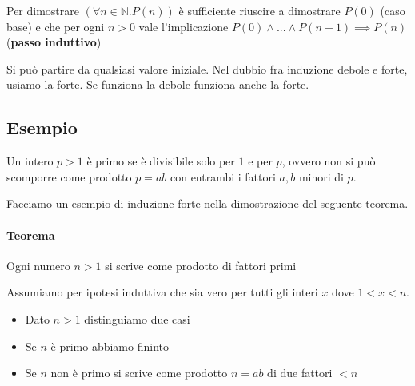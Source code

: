 Per dimostrare $\left(\forall n \in \mathbb{N} . P(n) \right)$ è sufficiente riuscire a dimostrare $P(0)$ (caso base) e che per ogni $n > 0$ vale l'implicazione $P(0) \land ... \land P(n - 1) \implies P(n)$ ({\bf passo induttivo})

Si può partire da qualsiasi valore iniziale. Nel dubbio fra induzione debole e forte, usiamo la forte. Se funziona la debole funziona anche la forte.

\subsection{Esempio}

Un intero $p > 1$ è primo se è divisibile solo per $1$ e per $p$, ovvero non si può scomporre come prodotto $p = ab$ con entrambi i fattori $a,b$ minori di $p$.

Facciamo un esempio di induzione forte nella dimostrazione del seguente teorema.

\paragraph{Teorema} Ogni numero $n > 1$ si scrive come prodotto di fattori primi

Assumiamo per ipotesi induttiva che sia vero per tutti gli interi $x$ dove $1 < x < n$. 

\begin{itemize}
	
	\item Dato $n > 1$ distinguiamo due casi
	\item Se $n$ è primo abbiamo fininto
	\item Se $n$ non è primo si scrive come prodotto $n = ab$ di due fattori $< n$
	
\end{itemize}
